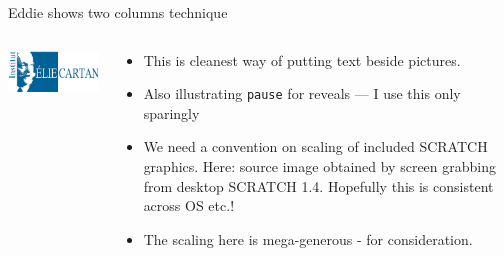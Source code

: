 



\begin{frame}{Eddie shows two columns technique}
\begin{columns}
\begin{column}{0.4\textwidth}
\begin{center}
\includegraphics[scale=0.75]{IECL.png}
\end{center}
\end{column}
\begin{column}{0.6\textwidth}
\begin{itemize}
\item This is cleanest way of putting text beside
pictures. 
\pause\medskip
\item Also illustrating {\tt pause} for reveals --- I 
use this only sparingly
\pause\medskip
\item We need a convention on scaling of included SCRATCH graphics. Here: source image obtained by screen grabbing from desktop SCRATCH 1.4. Hopefully this is consistent across OS etc.! 
\medskip
\item The scaling here is mega-generous - for consideration.
\end{itemize}
\end{column}
\end{columns}
\end{frame}
